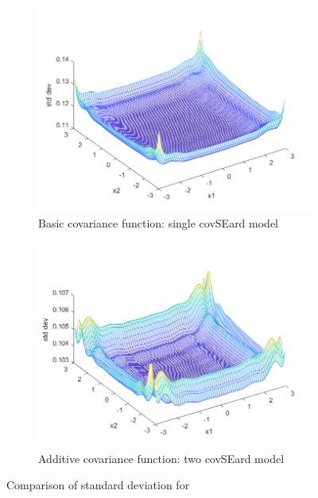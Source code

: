 \documentclass[]{article}
\begin{document}
\begin{figure}[!h]
	\begin{subfigure}{0.5\linewidth}
		\centering
		\includegraphics[width=\linewidth]{1e1b}
		\caption{Basic covariance function: single covSEard model}
		\label{fig:1e1}
	\end{subfigure}
	\begin{subfigure}{0.5\linewidth}
		\centering
		\includegraphics[width=\linewidth]{1e2b}
		\caption{Additive covariance function: two covSEard model}
		\label{fig:1e2}
	\end{subfigure}
	\caption{Comparison of standard deviation for }
	\label{fig:1e}
\end{figure}
\end{document}
